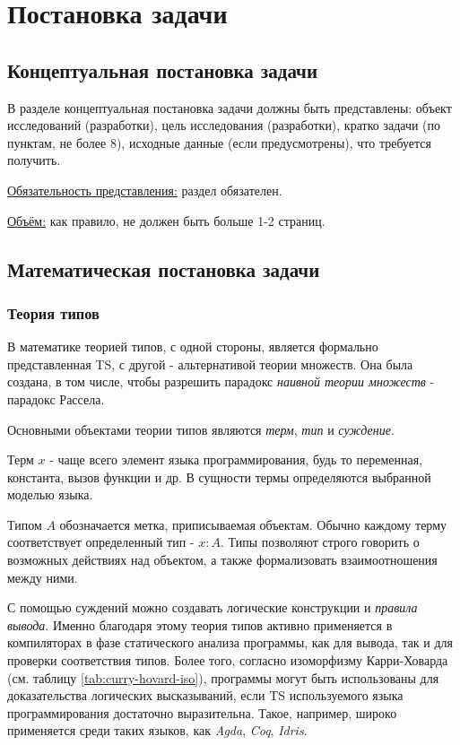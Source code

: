 \chapter{Постановка задачи}
\label{ch:task}
\section{Концептуальная постановка задачи}
\label{sec:abstract_task}

В разделе концептуальная постановка задачи должны быть представлены: объект исследований (разработки), цель исследования (разработки), кратко задачи (по пунктам, не более 8), исходные данные (если предусмотрены), что требуется получить.

\underline{Обязательность представления:} раздел обязателен.

\underline{Объём:} как правило, не должен быть больше 1-2 страниц.

\section{Математическая постановка задачи}
\label{sec:math_task}
\subsection{Теория типов}
\label{subsec:type_theory}

В математике теорией типов\cite{TypeTheoryBook}, с одной стороны, является формально представленная \gls{TS}, с другой - альтернативой теории множеств.
Она была создана, в том числе, чтобы разрешить парадокс \textit{наивной теории множеств} - парадокс Рассела. \cite{TheFoundationsOfArithmetic}

Основными объектами теории типов являются \textit{терм}, \textit{тип} и \textit{суждение}.

Терм $x$ - чаще всего элемент языка программирования, будь то переменная, константа, вызов функции и др.
В сущности термы определяются выбранной моделью языка.

Типом $A$ обозначается метка, приписываемая объектам.
Обычно каждому терму соответствует определенный тип - $x: A$.
Типы позволяют строго говорить о возможных действиях над объектом, а также формализовать взаимоотношения между ними.

С помощью суждений можно создавать логические конструкции и \textit{правила вывода}.
Именно благодаря этому теория типов активно применяется в компиляторах в фазе статического анализа программы, как для вывода, так и для проверки соответствия типов.
Более того, согласно изоморфизму Карри-Ховарда\cite{TypeTheoryArticle} (см. таблицу \ref{tab:curry-hovard-iso}), программы могут быть использованы для доказательства логических высказываний, если \gls{TS} используемого языка программирования достаточно выразительна.
Такое, например, широко применяется среди таких языков, как \textit{Agda}, \textit{Coq}, \textit{Idris}.

